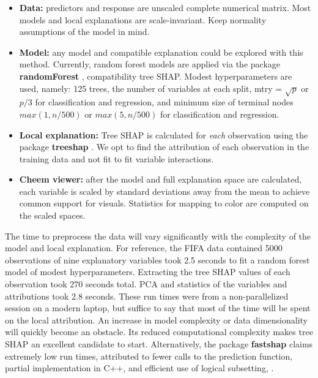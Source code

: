 \documentclass[
]{jss}
\providecommand{\tightlist}{%
  \setlength{\itemsep}{0pt}\setlength{\parskip}{0pt}}
\begin{document}
\begin{itemize}
\tightlist
\item
  \textbf{Data:} predictors and response are unscaled complete numerical
  matrix. Most models and local explanations are scale-invariant. Keep
  normality assumptions of the model in mind.
\item
  \textbf{Model:} any model and compatible explanation could be explored
  with this method. Currently, random forest models are applied via the
  package \textbf{randomForest} \citep{liaw_classification_2002},
  compatibility tree SHAP. Modest hyperparameters are used, namely: 125
  trees, the number of variables at each split, mtry = \(\sqrt{p}\) or
  \(p/3\) for classification and regression, and minimum size of
  terminal nodes \(max(1, n/500)\) or \(max(5, n/500)\) for
  classification and regression.
\item
  \textbf{Local explanation:} Tree SHAP is calculated for \emph{each}
  observation using the package \textbf{treeshap}
  \citep{kominsarczyk_treeshap_2021}. We opt to find the attribution of
  each observation in the training data and not fit to fit variable
  interactions.
\item
  \textbf{Cheem viewer:} after the model and full explanation space are
  calculated, each variable is scaled by standard deviations away from
  the mean to achieve common support for visuals. Statistics for mapping
  to color are computed on the scaled spaces.
\end{itemize}

The time to preprocess the data will vary significantly with the
complexity of the model and local explanation. For reference, the FIFA
data contained 5000 observations of nine explanatory variables took 2.5
seconds to fit a random forest model of modest hyperparameters.
Extracting the tree SHAP values of each observation took 270 seconds
total. PCA and statistics of the variables and attributions took 2.8
seconds. These run times were from a non-parallelized session on a
modern laptop, but suffice to say that most of the time will be spent on
the local attribution. An increase in model complexity or data
dimensionality will quickly become an obstacle. Its reduced
computational complexity makes tree SHAP an excellent candidate to
start. Alternatively, the package \textbf{fastshap} claims extremely low
run times, attributed to fewer calls to the prediction function, partial
implementation in C++, and efficient use of logical subsetting,
\citet{greenwell_fastshap_2020}.
\end{document}

